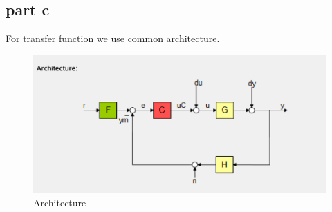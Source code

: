 \subsection{part c}
For transfer function we use common architecture.
\begin{figure}[H]
    \caption{Architecture}
    \centering
    \includegraphics[width=12cm]{../Figure/Q1/Q1_c/architecture.png}
\end{figure}
